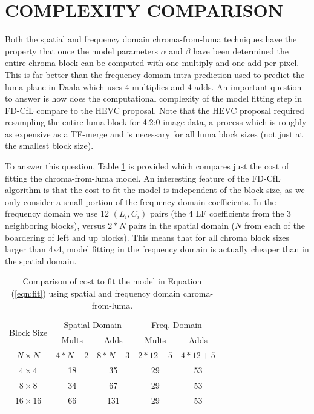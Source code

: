 \documentclass[a4paper]{spie}  %
\begin{document}
\section{COMPLEXITY COMPARISON}

Both the spatial and frequency domain chroma-from-luma techniques have the
 property that once the model parameters $\alpha$ and $\beta$ have been
 determined the entire chroma block can be computed with one multiply and one
 add per pixel.
This is far better than the frequency domain intra prediction used to predict
 the luma plane in Daala which uses 4 multiplies and 4 adds\cite{DaalaDemo2}.
An important question to answer is how does the computational complexity of
 the model fitting step in FD-CfL compare to the HEVC proposal\cite{JCTVCB021}.
Note that the HEVC proposal required resampling the entire luma block for 4:2:0
 image data, a process which is roughly as expensive as a TF-merge and
 is necessary for all luma block sizes (not just at the smallest block size).

To answer this question, Table \ref{tbl:comp} is provided which compares just
 the cost of fitting the chroma-from-luma model.
An interesting feature of the FD-CfL algorithm is that the cost to fit the
 model is independent of the block size, as we only consider a small portion
 of the frequency domain coefficients.
In the frequency domain we use 12 $(L_i,C_i)$ pairs (the 4 LF coefficients
 from the 3 neighboring blocks), versus $2*N$ pairs in the spatial domain ($N$
 from each of the boardering of left and up blocks).
This means that for all chroma block sizes larger than 4x4, model fitting in
 the frequency domain is actually cheaper than in the spatial domain.

\begin{table}[h]
\begin{center}
\begin{tabular}{|c|c|c|c|c|}
\hline
\multirow{2}{*}{Block Size} & \multicolumn{2}{|c|}{Spatial Domain} & \multicolumn{2}{|c|}{Freq. Domain} \\
\cline{2-5}
 & Mults & Adds & Mults & Adds \\
\hline
$N\times N$ & $4*N+2$ & $8*N+3$ & $2*12+5$ & $4*12+5$ \\
\hline
$4\times 4$ & 18 & 35 & 29 & 53 \\
\hline
$8\times 8$ & 34 & 67 & 29 & 53 \\
\hline
$16\times 16$\footnotemark[1] & 66 & 131 & 29 & 53 \\
\hline
\end{tabular}
\end{center}
\caption[example]{\label{tbl:comp} Comparison of cost to fit the model in
 Equation (\ref{eqn:fit}) using spatial and frequency domain chroma-from-luma.}
\end{table}
\end{document}
